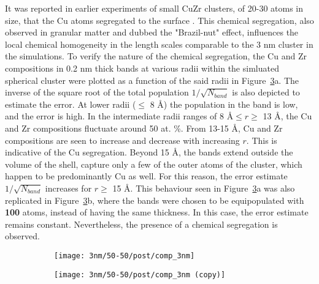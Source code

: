It was reported in earlier experiments of small CuZr clusters, of 20-30 atoms in size, that the Cu atoms segregated to the surface \cite{Kartouzian2014}. This chemical segregation, also observed in granular matter and dubbed the "Brazil-nut" effect, influences the local chemical homogeneity in the length scales comparable to the 3 nm cluster in the simulations. To verify the nature of the chemical segregation, the Cu and Zr compositions in 0.2 nm thick bands at various radii within the simluated spherical cluster were plotted as a function of the said radii in Figure~\ref{f:clus_rad-3nm}a. The inverse of the square root of the total population $1/\sqrt{N_{band}}$ is also depicted to estimate the error. At lower radii ($\leq$ 8 \r{A}) the population in the band is low, and the error is high. In the intermediate radii ranges of 8 \r{A}$\leq r \geq$ 13 \r{A}, the Cu and Zr compositions fluctuate around 50 at. \%. From 13-15 \r{A}, Cu and Zr compositions are seen to increase and decrease with increasing $r$. This is indicative of the Cu segregation. Beyond 15 \r{A}, the bands extend outside the volume of the shell, capture only a few of the outer atoms of the cluster, which happen to be predominantly Cu as well. For this reason, the error estimate $1/\sqrt{N_{band}}$ increases for $r \geq $ 15 \r{A}. This behaviour seen in Figure~\ref{f:clus_rad-3nm}a was also replicated in Figure~\ref{f:clus_rad-3nm}b, where the bands were chosen to be equipopulated with \textbf{100} atoms, instead of having the same thickness. In this case, the error estimate remains constant. Nevertheless, the presence of a chemical segregation is observed.  \par

\begin{figure}[!ht]
	\centering
	\begin{subfigure}{0.5\textwidth} 	\centering
		\texttt{[image: 3nm/50-50/post/comp\_3nm]}
		\label{fig:radial_3nm}
	\end{subfigure}%
	\vfill
	\begin{subfigure}{0.5\columnwidth} 	\centering
		\texttt{[image: 3nm/50-50/post/comp\_3nm (copy)]}
		\label{fig:radial_3nm_alt}
	\end{subfigure}%
	\label{f:clus_rad-3nm}
\end{figure}

